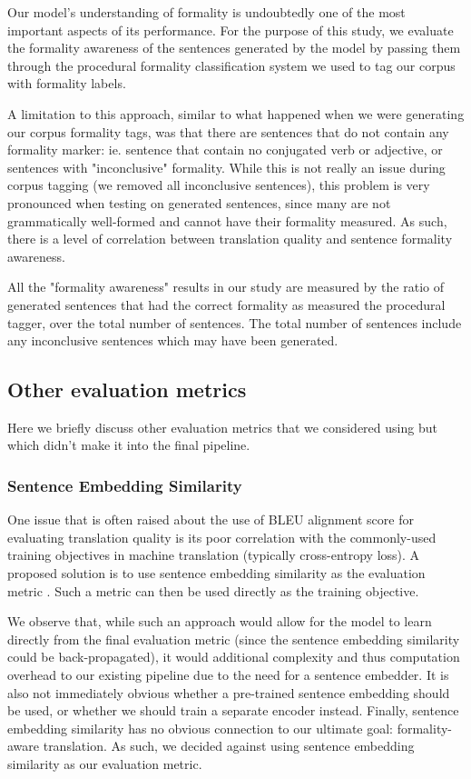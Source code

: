 \documentclass[11pt]{article}
\begin{document}
Our model's understanding of formality is undoubtedly one of the most important aspects of its performance. For the purpose of this study, we evaluate the formality awareness of the sentences generated by the model by passing them through the procedural formality classification system we used to tag our corpus with formality labels.

A limitation to this approach, similar to what happened when we were generating our corpus formality tags, was that there are sentences that do not contain any formality marker: ie. sentence that contain no conjugated verb or adjective, or sentences with "inconclusive" formality. While this is not really an issue during corpus tagging (we removed all inconclusive sentences), this problem is very pronounced when testing on generated sentences, since many are not grammatically well-formed and cannot have their formality measured. As such, there is a level of correlation between translation quality and sentence formality awareness.

All the "formality awareness" results in our study are measured by the ratio of generated sentences that had the correct formality as measured the procedural tagger, over the total number of sentences. The total number of sentences include any inconclusive sentences which may have been generated. 

\subsection{Other evaluation metrics}

Here we briefly discuss other evaluation metrics that we considered using but which didn't make it into the final pipeline.

\subsubsection{Sentence Embedding Similarity}

One issue that is often raised about the use of BLEU alignment score for evaluating translation quality is its poor correlation with the commonly-used training objectives in machine translation (typically cross-entropy loss). A proposed solution is to use sentence embedding similarity as the evaluation metric \cite{wieting2019bleu}. Such a metric can then be used directly as the training objective.

We observe that, while such an approach would allow for the model to learn directly from the final evaluation metric (since the sentence embedding similarity could be back-propagated), it would additional complexity and thus computation overhead to our existing pipeline due to the need for a sentence embedder. It is also not immediately obvious whether a pre-trained sentence embedding should be used, or whether we should train a separate encoder instead. Finally, sentence embedding similarity has no obvious connection to our ultimate goal: formality-aware translation. As such, we decided against using sentence embedding similarity as our evaluation metric.
\end{document}
